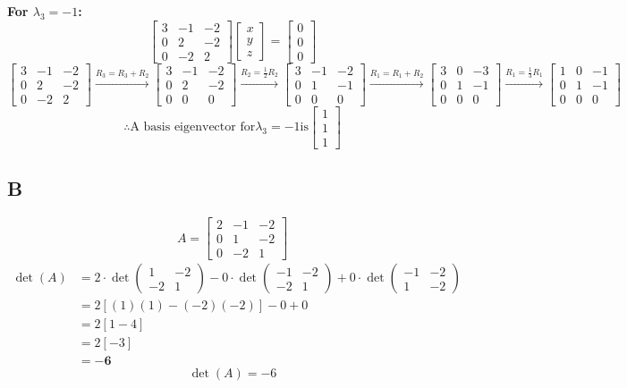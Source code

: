 \documentclass{article}
\newcommand{\mat}[1]{\begin{bmatrix} #1 \end{bmatrix}}
\newcommand{\vect}[1]{\begin{bmatrix} #1 \end{bmatrix}}
\begin{document}
\textbf{For $\lambda_3 = -1$:}
\[
	\mat{ 3 & -1 & -2 \\ 0 & 2 & -2 \\ 0 & -2 & 2 } \vect{x \\ y \\ z} = \vect{0 \\ 0 \\ 0}
\]
\[
	\mat{ 3 & -1 & -2 \\ 0 & 2 & -2 \\ 0 & -2 & 2 }
	\xrightarrow{R_3 = R_3 + R_2}
	\mat{ 3 & -1 & -2 \\ 0 & 2 & -2 \\ 0 & 0 & 0 }
	\xrightarrow{R_2 = \frac{1}{2}R_2}
	\mat{ 3 & -1 & -2 \\ 0 & 1 & -1 \\ 0 & 0 & 0 }
	\xrightarrow{R_1 = R_1 + R_2}
	\mat{ 3 & 0 & -3 \\ 0 & 1 & -1 \\ 0 & 0 & 0 }
	\xrightarrow{R_1 = \frac{1}{3}R_1}
	\mat{ 1 & 0 & -1 \\ 0 & 1 & -1 \\ 0 & 0 & 0 }
\]
\[
	\therefore \text{A basis eigenvector for} \lambda_3 = -1 \text{is}
	\begin{bmatrix}
		1 \\ 1 \\ 1
	\end{bmatrix}
\]

\subsection*{B}

\[
	A = \mat{ 2 & -1 & -2 \\ 0 & 1 & -2 \\ 0 & -2 & 1 }
\]
\[
	\begin{aligned}
		\det(A) & = 2 \cdot \det \begin{pmatrix} 1 & -2 \\ -2 & 1 \end{pmatrix} - 0 \cdot \det \begin{pmatrix} -1 & -2 \\ -2 & 1 \end{pmatrix} + 0 \cdot \det \begin{pmatrix} -1 & -2 \\ 1 & -2 \end{pmatrix} \\
		        & = 2 \left[ (1)(1) - (-2)(-2) \right] - 0 + 0                                                                                                                                                \\
		        & = 2 [1 - 4]                                                                                                                                                                                 \\
		        & = 2 [-3]                                                                                                                                                                                    \\
		        & = \mathbf{-6}
	\end{aligned}
\]
\[
	\det(A) = -6
\]
\end{document}
